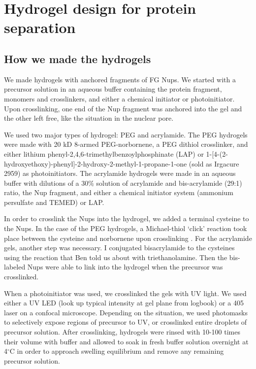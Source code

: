\chapter{Hydrogel design for protein separation}\label{ch03}
\section{How we made the hydrogels}
We made hydrogels with anchored fragments of FG Nups.  We started with a precursor solution in an aqueous buffer containing the protein fragment, monomers and crosslinkers, and either a chemical initiator or photoinitiator.  Upon crosslinking, one end of the Nup fragment was anchored into the gel and the other left free, like the situation in the nuclear pore.

We used two major types of hydrogel: PEG and acrylamide.  The PEG hydrogels were made with 20 kD 8-armed PEG-norbornene, a PEG dithiol crosslinker, and either lithium phenyl-2,4,6-trimethylbenzoylphosphinate (LAP) \cite{fairbanks09} or 1-[4-(2-hydroxyethoxy)-phenyl]-2-hydroxy-2-methyl-1-propane-1-one (sold as Irgacure 2959) %
as photoinitiators.  The acrylamide hydrogels were made in an aqueous buffer with dilutions of a 30\% solution of acrylamide and bis-acrylamide (29:1) ratio, the Nup fragment, and either a chemical initiator system (ammonium persulfate and TEMED) or LAP.

In order to crosslink the Nups into the hydrogel, we added a terminal cysteine to the Nups.  In the case of the PEG hydrogels, a Michael-thiol `click' reaction took place between the cysteine and norbornene upon crosslinking \cite{chatani14}.  For the acrylamide gels, another step was necessary.  I conjugated bisacrylamide to the cysteines using the reaction that Ben told us about with triethanolamine.  Then the bis-labeled Nups were able to link into the hydrogel when the precursor was crosslinked.

When a photoinitiator was used, we crosslinked the gels with UV light.  We used either a UV LED (look up typical intensity at gel plane from logbook) or a 405 laser on a confocal microscope.  Depending on the situation, we used photomasks to selectively expose regions of precursor to UV, or crosslinked entire droplets of precursor solution.  After crosslinking, hydrogels were rinsed with 10-100 times their volume with buffer and allowed to soak in fresh buffer solution overnight at 4$^\circ$C in order to approach swelling equilibrium and remove any remaining precursor solution.

